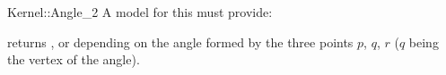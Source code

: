 \begin{ccRefFunctionObjectConcept}{Kernel::Angle_2}
A model for this must provide:


{returns ,  or  depending
on the angle formed by the three points $p$, $q$, $r$ ($q$ being the vertex of
the angle).}

\ccIsModel{}

\end{ccRefFunctionObjectConcept}
